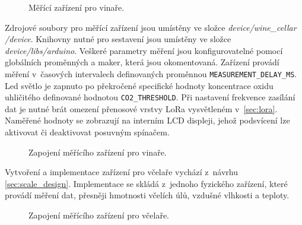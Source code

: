 \begin{figure}[h]
  \centering
  
  \caption{Měřící zařízení pro vinaře.}
  \label{pic:winemaker_device}
\end{figure}

Zdrojové soubory pro měřící zařízení jsou umístěny ve složce \textit{device/wine\_cellar /device}. Knihovny nutné pro sestavení jsou umístěny ve složce \textit{device/libs/arduino}. Veškeré parametry měření jsou konfigurovatelné pomocí globálních proměnných a maker, která jsou okomentovaná. Zařízení provádí měření v~časových intervalech definovaných proměnnou \texttt{MEASUREMENT\_DELAY\_MS}. Led světlo je zapnuto po překročené specifické hodnoty koncentrace oxidu uhličitého definované hodnotou \texttt{CO2\_THRESHOLD}. Při nastavení frekvence zasílání dat je nutné brát omezení přenosové vrstvy LoRa vysvětleném v~\ref{sec:lora}. Naměřené hodnoty se zobrazují na interním LCD displeji, jehož podsvícení lze aktivovat či deaktivovat posuvným spínačem.

\begin{figure}[h]
  \centering
  
  \caption{Zapojení měřícího zařízení pro vinaře.}
  \label{pic:winemaker_device_setup}
\end{figure}

Vytvoření a implementace zařízení pro včelaře vychází z~návrhu \ref{sec:scale_design}. Implementace se skládá z~jednoho fyzického zařízení, které provádí měření dat, přesněji hmotnosti včelích úlů, vzdušné vlhkosti a teploty.

\begin{figure}[h]
  \centering
  
  \caption{Zapojení měřícího zařízení pro včelaře.}
  \label{pic:beescale_device_setup}
\end{figure}

